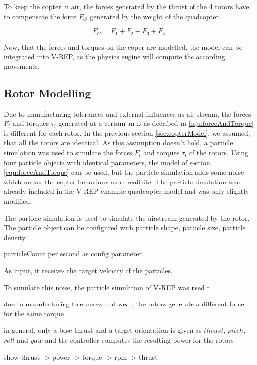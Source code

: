 To keep the copter in air, the forces generated by the thrust of the 4 rotors have to compensate the force $F_{G}$ generated by the weight of the quadcopter.

\begin{equation}
F_G = F_1 + F_2 +F_3 + F_4
\end{equation}

Now, that the forces and torques on the coper are modelled, the model can be integrated into V-REP, as the physics engine will compute the according movements.

\subsection{Rotor Modelling}

Due to manufacturing tolerances and external influences as air stream, the forces $F_i$ and torques $\tau_i$ generated at a certain an $\omega$ as decribed in \ref{equ:forceAndTorque} is different for each rotor. In the previous section \ref{sec:copterModel}, we assumed, that all the rotors are identical. As this assumption doesn't hold, a particle simulation was used to simulate the forces $F_i$ and torques $\tau_i$ of the rotors. Using four particle objects with identical parameters, the model of section \ref{equ:forceAndTorque} can be used, but the particle simulation adds some noise which makes the copter behaviour more realisitc. The particle simulation was already included in the V-REP example quadcopter model and was only slightly modified.

The particle simulation is used to simulate the airstream generated by the rotor. The particle object can be configured with particle shape, particle size, particle density. 

\par{particleCount per second as config parameter}




As input, it receives the target velocity of the particles. 




To simulate this noise, the particle simulation of V-REP was used t

\par{due to manufacturing tolerances and wear, the rotors generate a different force for the same torque}
\par{in general, only a base thrust and a target orientation is given as $thrust$, $pitch$, $roll$ and $yaw$ and the controller computes the resulting power for the rotors}
\par{ show thrust -> power -> torque -> rpm -> thrust}

